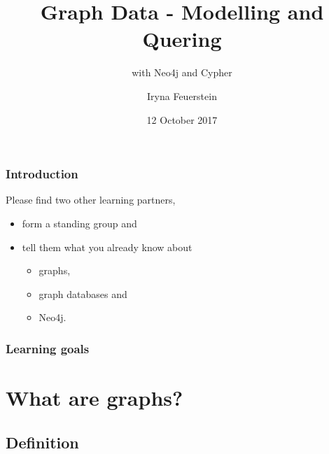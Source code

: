 \documentclass[12pt]{beamer}
\title{Graph Data - Modelling and Quering}
\subtitle{with Neo4j and Cypher}
\author[I.Feuerstein]{Iryna Feuerstein}
\institute[ODSC]{Open Data Science Conference}
\date{12 October 2017}
\begin{document}
    
    \begin{frame}
        \frametitle{Introduction}
        Please find two other learning partners, 
        \begin{itemize}
            \item form a standing group and 
            \item tell them what you already know about \begin{itemize}
                \item graphs, 
                \item graph databases and 
                \item Neo4j.
            \end{itemize}
        \end{itemize}
    \end{frame}
    
    \maketitle
    
    \begin{frame}
        \frametitle{Learning goals}
        \tableofcontents
    \end{frame}
    
    \section{What are graphs?}
    \subsection{Definition}
    
\end{document}

